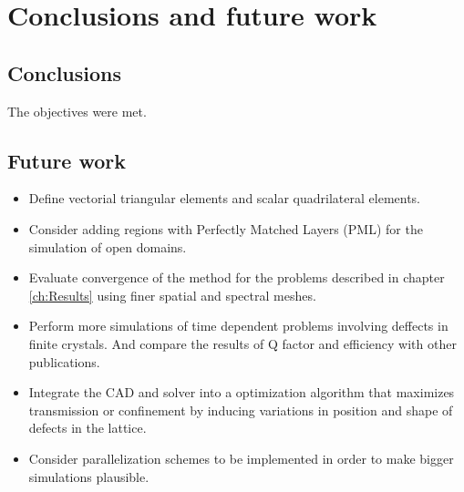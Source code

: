 \chapter{Conclusions and future work}

\section{Conclusions}
The objectives were met.

\section{Future work}
\begin{itemize}
\item Define vectorial triangular elements and scalar quadrilateral elements.
\item Consider adding regions with Perfectly Matched Layers (PML) for the simulation of
	  open domains.
\item Evaluate convergence of the method for the problems described in chapter \ref{ch:Results} using finer spatial and spectral meshes. 
\item Perform more simulations of time dependent problems involving deffects in finite crystals. And compare the results of Q factor and efficiency with other publications.
\item Integrate the CAD and solver into a optimization algorithm that maximizes transmission or confinement by inducing variations in position and shape of defects in the lattice.
\item Consider parallelization schemes to be implemented in order to make bigger simulations plausible.
\end{itemize}


